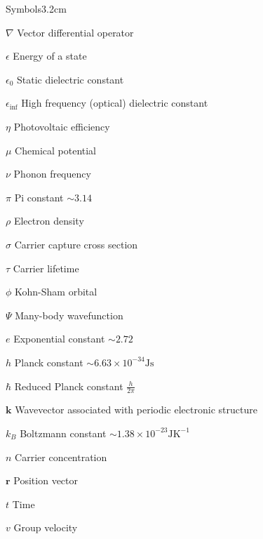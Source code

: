 \begin{mclistof}{Symbols}{3.2cm}

\item[$\nabla$] Vector differential operator
\item[$\epsilon$] Energy of a state
\item[$\epsilon_0$] Static dielectric constant
\item[$\epsilon_{\inf}$] High frequency (optical) dielectric constant 
\item[$\eta$] Photovoltaic efficiency
\item[$\mu$] Chemical potential
\item[$\nu$] Phonon frequency
\item[$\pi$] Pi constant $\sim 3.14$
\item[$\rho$] Electron density
\item[$\sigma$] Carrier capture cross section
\item[$\tau$] Carrier lifetime
\item[$\phi$] Kohn-Sham orbital

\vspace{\frontmatterbaselineskip}

\item[$\Psi$] Many-body wavefunction

\vspace{\frontmatterbaselineskip}

\item[$e$] Exponential constant $\sim 2.72$
\item[$h$] Planck constant $\sim 6.63\times10^{-34}\textrm{Js}$
\item[$\hbar$] Reduced Planck constant $\frac{h}{2\pi}$ 
\item[$\textbf{k}$] Wavevector associated with periodic electronic structure
\item[$k_B$] Boltzmann constant $\sim 1.38\times10^{-23}\textrm{JK}^{-1}$
\item[$n$] Carrier concentration
\item[$\textbf{r}$] Position vector
\item[$t$] Time
\item[$v$] Group velocity

\vspace{\frontmatterbaselineskip}


\end{mclistof}
